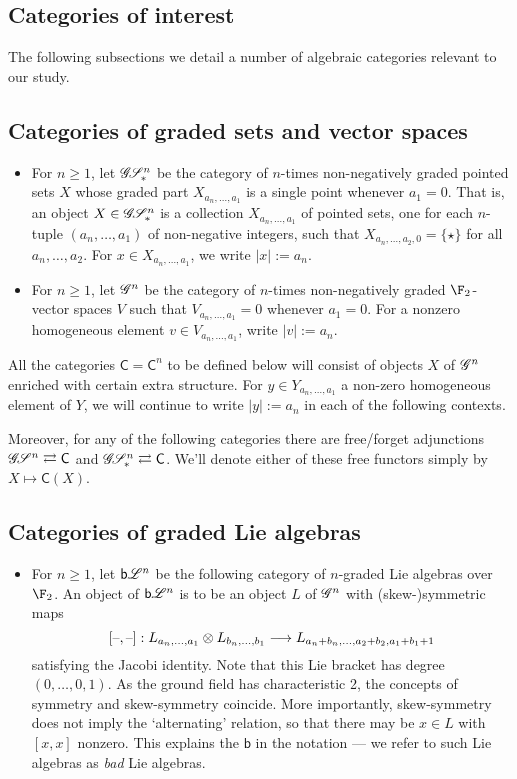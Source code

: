 \documentclass[11pt]{article}
\newcommand{\BadLie}[1]{\mathsf{b}{\scrL}^{#1}}%
\newcommand{\GR}[1]{\scrG^{#1}}%
\newcommand{\GS}[1]{\scrG\!\scrS^{#1}}
\newcommand{\GpS}[1]{\scrG\!\scrS^{#1}_*}
\newcommand{\Fr}[1]{#1}%
\begin{document}
\begin{CategoriesOfInterest}
\section*{Categories of interest}
The following subsections we detail a number of algebraic categories relevant to our study.
\subsection*{Categories of graded sets and vector spaces}
\begin{itemize}
\setlength{\parindent}{.25in}
\item For $n\geq1$, let $\GpS{n}$ be the category of $n$-times non-negatively graded pointed sets $X$ whose graded part $X_{a_n,\ldots,a_1}$ is a single point whenever $a_1=0$. That is, an object $X\in\GpS{n}$ is a collection $X_{a_n,\ldots,a_1}$ of pointed sets, one for each $n$-tuple $(a_n,\ldots,a_1)$ of non-negative integers, such that $X_{a_n,\ldots,a_2,0}=\{\star\}$ for all $a_n,\ldots,a_2$. For $x\in X_{a_n,\ldots,a_1}$, we write $|x|:=a_n$.

\item For $n\geq1$, let $\GR{n}$ be the category of $n$-times non-negatively graded $\F_2$-vector spaces $V$ such that $V_{a_n,\ldots,a_1}=0$ whenever $a_1=0$.  For a nonzero homogeneous element $v\in V_{a_n,\ldots,a_1}$, write $|v|:=a_n$.
\end{itemize}
All the categories $\mathsf{C}=\mathsf{C}^n$ to be defined below will consist of objects $X$ of $\GR{n}$ enriched with certain extra structure. For $y\in Y_{a_n,\ldots,a_1}$ a non-zero homogeneous element of $Y$, we will continue to write $|y|:=a_n$ in each of the following contexts.

Moreover, for any of the following categories there are free/forget adjunctions $\GS{n} \rightleftarrows \mathsf{C}$ and $\GpS{n} \rightleftarrows \mathsf{C}$. We'll denote either of these free functors simply by $X\mapsto\Fr{\mathsf{C}}(X)$.


\subsection*{Categories of graded Lie algebras}

\begin{itemize}
\setlength{\parindent}{.25in}
\item For $n\geq1$, let $\BadLie{n}$ be the following category of $n$-graded Lie algebras over $\F_2$. An object of $\BadLie{n}$ is to be an object $L$ of $\GR{n}$ with (skew-)symmetric maps
\[[\textup{--},\textup{--}]:L_{a_n,\ldots,a_1}\otimes L_{b_n,\ldots,b_1}\longrightarrow L_{a_n+b_n,\ldots,a_2+b_2,a_1+b_1+1}\]
satisfying the Jacobi identity. Note that this Lie bracket has degree $(0,\ldots,0,1)$. As the ground field has characteristic 2, the concepts of symmetry and skew-symmetry coincide. More importantly, skew-symmetry does not imply the `alternating' relation, so that there may be $x\in L$ with $[x,x]$ nonzero. This explains the $\mathsf{b}$ in the notation --- we refer to such Lie algebras as \emph{bad} Lie algebras.


\end{itemize}
\end{CategoriesOfInterest}
\end{document}
